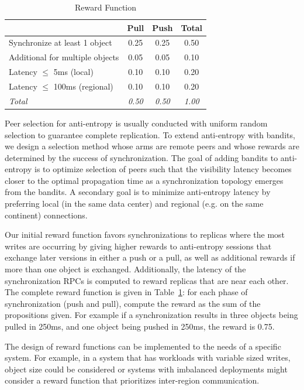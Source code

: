 \begin{table}[ht]
\centering
\begin{tabular}{@{}l c c c @{}}
\toprule
& \textbf{Pull} & \textbf{Push} & \textbf{Total} \\
\midrule
Synchronize at least 1 object & 0.25 & 0.25 & 0.50 \\
Additional for multiple objects  & 0.05 & 0.05 & 0.10 \\
Latency $\leq$ 5ms (local)        & 0.10 & 0.10 & 0.20 \\
Latency $\leq$ 100ms (regional)   & 0.10 & 0.10 & 0.20 \\
\midrule
\textit{Total} & \textit{0.50} & \textit{0.50} & \textit{1.00} \\
\bottomrule
\end{tabular}
\caption{Reward Function}
\label{tab:rewards}
\end{table}

Peer selection for anti-entropy is usually conducted with uniform random
selection to guarantee complete replication.
To extend anti-entropy with bandits, we design a selection method whose arms
are remote peers and whose rewards are determined by the success of
synchronization.
The goal of adding bandits to anti-entropy is to optimize selection of peers
such that the visibility latency becomes closer to the optimal propagation
time as a synchronization topology emerges from the bandits.
A secondary goal is to minimize anti-entropy latency by preferring local (in
the same data center) and regional (e.g. on the same continent) connections.

Our initial reward function favors synchronizations to replicas where the
most writes are occurring by giving higher rewards to anti-entropy sessions
that exchange later versions in either a push or a pull, as well as additional
rewards if more than one object is exchanged.
Additionally, the latency of the synchronization RPCs is computed to reward
replicas that are near each other.
The complete reward function is given in Table~\ref{tab:rewards}: for each
phase of synchronization (push and pull), compute the reward as the sum of the
propositions given.
For example if a synchronization results in three objects being pulled in
250ms, and one object being pushed in 250ms, the reward is 0.75.

The design of reward functions can be implemented to the needs of a specific
system.
For example, in a system that has workloads with variable sized writes, object
size could be considered or systems with imbalanced deployments might
consider a reward function that prioritizes inter-region communication.

